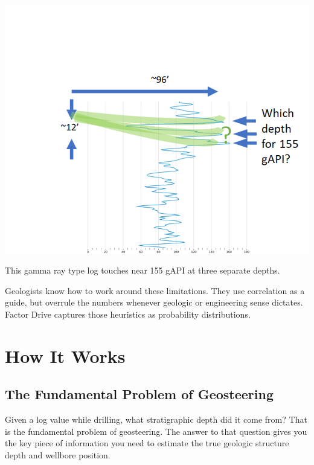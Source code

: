 \documentclass{tufte-handout}
\begin{document}
\begin{marginfigure}
  \includegraphics{which-depth-for-155-gapi.png}
  \caption{This gamma ray type log touches near 155 gAPI at three separate depths.}
  \label{fig:which-depth-for-155-gapi}
\end{marginfigure}

Geologists know how to work around these limitations. They use correlation as a guide, but overrule the numbers whenever geologic or engineering sense dictates. Factor Drive captures those heuristics as probability distributions.

\section{How It Works}\label{sec:how-it-doesnt-work}
\subsection{The Fundamental Problem of Geosteering}\label{sec:fundamental-problem}

Given a log value while drilling, what stratigraphic depth did it come from? That is the 
fundamental problem of geosteering. The answer to that question gives you the key piece of information you need
to estimate the true geologic structure depth and wellbore position.
\end{document}
